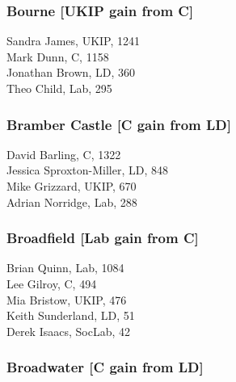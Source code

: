 \documentclass[a4paper,openany,10pt]{book}
\begin{document}
\subsubsection*{Bourne \hspace*{\fill}\nolinebreak[1]%
\enspace\hspace*{\fill}
[UKIP gain from C]}



Sandra James, UKIP, 1241\\
Mark Dunn, C, 1158\\
Jonathan Brown, LD, 360\\
Theo Child, Lab, 295\\


\subsubsection*{Bramber Castle \hspace*{\fill}\nolinebreak[1]%
\enspace\hspace*{\fill}
[C gain from LD]}



David Barling, C, 1322\\
{Jessica Sproxton-Miller}, LD, 848\\
Mike Grizzard, UKIP, 670\\
Adrian Norridge, Lab, 288\\


\subsubsection*{Broadfield \hspace*{\fill}\nolinebreak[1]%
\enspace\hspace*{\fill}
[Lab gain from C]}



Brian Quinn, Lab, 1084\\
Lee Gilroy, C, 494\\
Mia Bristow, UKIP, 476\\
Keith Sunderland, LD, 51\\
Derek Isaacs, SocLab, 42\\


\subsubsection*{Broadwater \hspace*{\fill}\nolinebreak[1]%
\enspace\hspace*{\fill}
[C gain from LD]}
\end{document}
